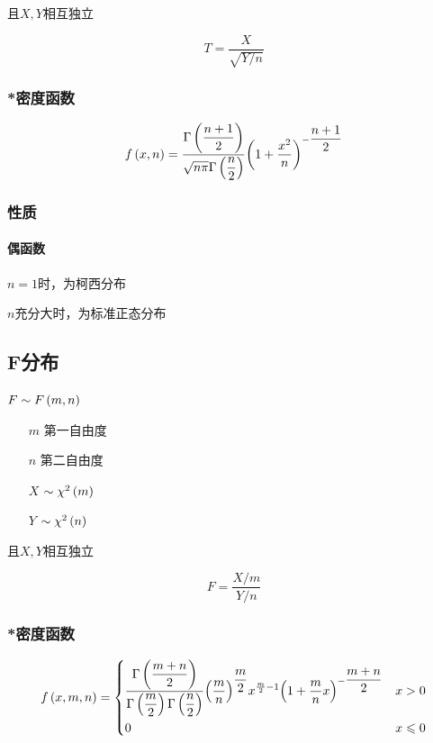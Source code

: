 \documentclass{article}
\begin{document}
且$X,Y$相互独立

\[T=\frac{X}{\sqrt{Y/n}}\]

\subsubsection{*密度函数}

\[f\left(x,n\right)=\frac{\Gamma\left(\dfrac{n+1}2\right)}{\sqrt{n\pi}\Gamma\left(\dfrac n2\right)}{\left(1+\frac{x^2}n\right)}^{-\dfrac{n+1}2}\]

\subsubsection{性质}

\paragraph{偶函数}

$n=1$时，为柯西分布

$n$充分大时，为标准正态分布

\subsection{F分布}

$F\sim F\left(m,n\right)$

\begin{enumerate}
    \item [$m$] 第一自由度
    \item [$n$] 第二自由度
    \item [$X$] $\sim\chi^2\left(m\right)$
    \item [$Y$] $\sim\chi^2\left(n\right)$
\end{enumerate}

且$X,Y$相互独立

\[F=\frac{X/m}{Y/n}\]

\subsubsection{*密度函数}

\[f\left(x,m,n\right)=
    \left\{\begin{aligned}
         & \frac{\Gamma\left(\dfrac{m+n}2\right)}{\Gamma\left(\dfrac m2\right)\Gamma\left(\dfrac n2\right)}{\left(\frac mn\right)}^{\dfrac m2}x^{\frac m2-1}{\left(1+\frac mnx\right)}^{-\dfrac{m+n}2} &  & x>0         \\
         & 0                                                                                                                                              &  & x\leqslant0 \\
    \end{aligned}\right.\]
\end{document}
